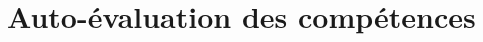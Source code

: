 \documentclass{rapportCS}
\begin{document}
\clearpage

\section{Auto-évaluation des compétences}



\clearpage
\appendix



\clearpage
{}
{}
\begin{otherlanguage}{english}
\renewcommand{\refname}{Références bibliographiques}
\small


\end{otherlanguage}
\end{document}
